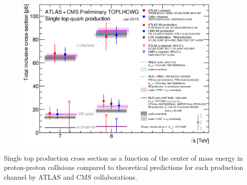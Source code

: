 \begin{frame}{}
\vspace{-.2cm}
\begin{figure}[!Hhtbp]
  \begin{center}
    \includegraphics[width=0.9\textwidth]{../figs/singletop_allchanvsroots.png}
  \end{center}
\end{figure}

\vspace{-.2cm}
    \begin{block}{}
      \tiny \centering Single top production cross section as a function of the center of mass energy in proton-proton collisions compared to theoretical predictions for each production channel by ATLAS and CMS collaborations.
    \end{block}

\end{frame}


